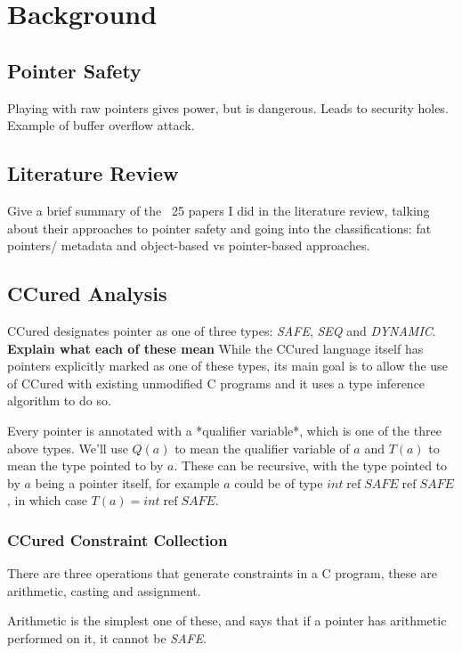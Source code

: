 \chapter{Background}

\section{Pointer Safety}

Playing with raw pointers gives power, but is dangerous. Leads to security holes. Example of buffer overflow attack.

\section{Literature Review}

Give a brief summary of the ~25 papers I did in the literature review, talking about their approaches to pointer safety and going into the classifications: fat pointers/ metadata and object-based vs pointer-based approaches.

\section{CCured Analysis}

CCured designates pointer as one of three types: \textit{SAFE}, \textit{SEQ} and \textit{DYNAMIC}.
\textbf{Explain what each of these mean}
While the CCured language itself has pointers explicitly marked as one of these types, its main goal is to allow the use of CCured with existing unmodified C programs and it uses a type inference algorithm to do so.

Every pointer is annotated with a *qualifier variable*, which is one of the three above types.
We'll use $Q(a)$ to mean the qualifier variable of $a$ and $T(a)$ to mean the type pointed to by $a$.
These can be recursive, with the type pointed to by $a$ being a pointer itself, for example $a$ could be of type $int\; \mbox{ref}\; SAFE\; \mbox{ref}\; SAFE$, in which case $T(a) = int\;\mbox{ref}\;SAFE$.

\subsection{CCured Constraint Collection}

There are three operations that generate constraints in a C program, these are arithmetic, casting and assignment.

Arithmetic is the simplest one of these, and says that if a pointer has arithmetic performed on it, it cannot be \textit{SAFE}.

